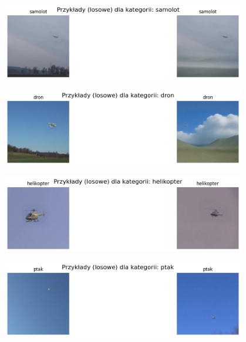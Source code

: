 \begin{figure}[H]
    \centering
    \includegraphics[width=0.95\textwidth]{img/zad3/podpunkt1.png}
    \label{fig:z3_images}
\end{figure}
\begin{figure}[H]
    \centering
    \includegraphics[width=0.95\textwidth]{img/zad3/podpunkt2.png}
    \label{fig:z3_images}
\end{figure}
\begin{figure}[H]
    \centering
    \includegraphics[width=0.95\textwidth]{img/zad3/podpunkt3.png}
    \label{fig:z3_images}
\end{figure}
\begin{figure}[H]
    \centering
    \includegraphics[width=0.95\textwidth]{img/zad3/podpunkt4.png}
    \label{fig:z3_images}
\end{figure}




